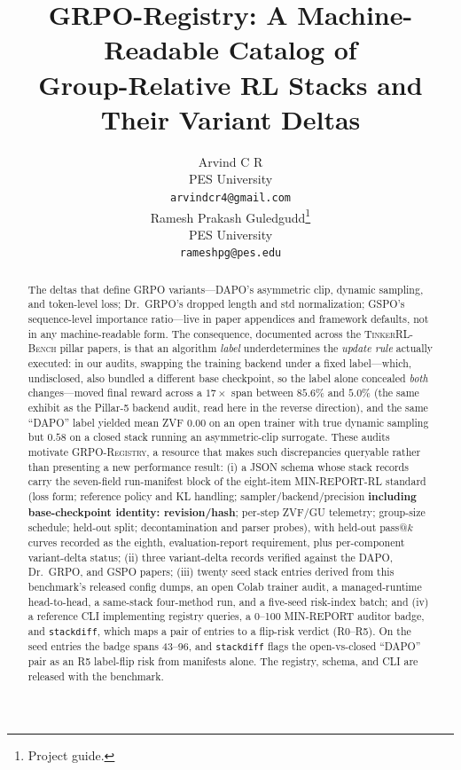 \documentclass{article}
\title{GRPO-Registry: A Machine-Readable Catalog of\\
       Group-Relative RL Stacks and Their Variant Deltas}
\author{
  Arvind C R \\
  PES University\\
  \texttt{arvindcr4@gmail.com} \\
  \And
  Ramesh Prakash Guledgudd\thanks{Project guide.} \\
  PES University\\
  \texttt{rameshpg@pes.edu} \\
}
\newcommand{\ours}{\textsc{TinkerRL-Bench}}
\begin{document}
\sloppy {}  \hfuzz=2pt
\maketitle
\begin{abstract}
The deltas that define GRPO variants---DAPO's asymmetric clip, dynamic sampling,
and token-level loss; Dr.~GRPO's dropped length and std normalization; GSPO's
sequence-level importance ratio---live in paper appendices and framework
defaults, not in any machine-readable form. The consequence, documented across
the \ours{} pillar papers, is that an algorithm \emph{label} underdetermines the
\emph{update rule} actually executed: in our audits, swapping the training backend
under a fixed label---which, undisclosed, also bundled a different base checkpoint,
so the label alone concealed \emph{both} changes---moved final reward across a
$17\times$ span between $85.6\%$ and $5.0\%$ (the same exhibit as the Pillar-5
backend audit, read here in the reverse direction),
and the same ``DAPO'' label yielded mean ZVF $0.00$ on an open trainer with true
dynamic sampling but $0.58$ on a closed stack running an asymmetric-clip
surrogate. These audits motivate \textsc{GRPO-Registry}, a resource that makes
such discrepancies queryable rather than presenting a new performance result:
(i) a JSON schema whose stack records carry the seven-field run-manifest block
of the eight-item MIN-REPORT-RL standard (loss form; reference policy and KL handling;
sampler/backend/precision \textbf{including base-checkpoint identity: revision/hash};
per-step ZVF/GU telemetry; group-size schedule;
held-out split; decontamination and parser probes), with held-out pass@$k$
curves recorded as the eighth, evaluation-report requirement, plus per-component
variant-delta status; (ii) three variant-delta records verified against the
DAPO, Dr.~GRPO, and GSPO papers; (iii) twenty seed stack entries derived from
this benchmark's released config dumps, an open Colab trainer audit, a
managed-runtime head-to-head, a same-stack four-method run, and a five-seed
risk-index batch; and (iv) a reference CLI implementing registry
queries, a 0--100 MIN-REPORT auditor badge, and \texttt{stackdiff}, which maps a
pair of entries to a flip-risk verdict (R0--R5). On the seed entries the badge
spans 43--96, and \texttt{stackdiff} flags the open-vs-closed ``DAPO'' pair as
an R5 label-flip risk from manifests alone. The registry, schema, and CLI are
released with the benchmark.
\end{abstract}
\end{document}
